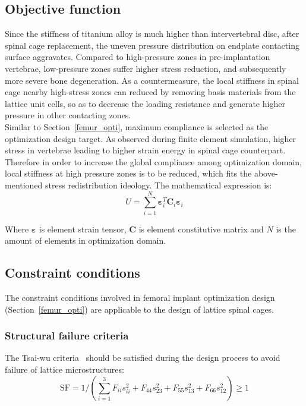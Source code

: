 \documentclass[12pt]{extbook}
\begin{document}
\subsection{Objective function}

Since the stiffness of titanium alloy is much higher than intervertebral disc, after spinal cage replacement, the uneven pressure distribution on endplate contacting surface aggravates. Compared to high-pressure zones in pre-implantation vertebrae, low-pressure zones suffer higher stress reduction, and subsequently more severe bone degeneration. As a countermeasure, the local stiffness in spinal cage nearby high-stress zones can reduced by removing basis materials from the lattice unit cells, so as to decrease the loading resistance and generate higher pressure in other contacting zones.\\

Similar to Section~\ref{femur_opti}, maximum compliance is selected as the optimization design target. As observed during finite element simulation, higher stress in vertebrae leading to higher strain energy in spinal cage counterpart. Therefore in order to increase the global compliance among optimization domain, local stiffness at high pressure zones is to be reduced, which fits the above-mentioned stress redistribution ideology. The mathematical expression is:
\begin{equation}
U = \sum_{i=1}^N \bm{\varepsilon}_i^T\bm{C}_i\bm{\varepsilon}_i
\label{4-2-T1}
\end{equation}

Where $\bm{\varepsilon}$ is element strain tensor, $\bm{C}$ is element constitutive matrix and $N$ is the amount of elements in optimization domain.\\

\subsection{Constraint conditions}

The constraint conditions involved in femoral implant optimization design (Section~\ref{femur_opti}) are applicable to the design of lattice spinal cages.\\

\subsubsection{Structural failure criteria}

The Tsai-wu criteria~\cite{tsai1971general} should be satisfied during the design process to avoid failure of lattice microstructures:
\begin{equation}
\text{SF} = 1 / (\sum_{i=1}^{3}F_{ii}s_{ii}^2 + F_{44}s_{23}^2 + F_{55}s_{13}^2 + F_{66}s_{12}^2)  \geq 1
\label{4-2-2}
\end{equation}
\end{document}

